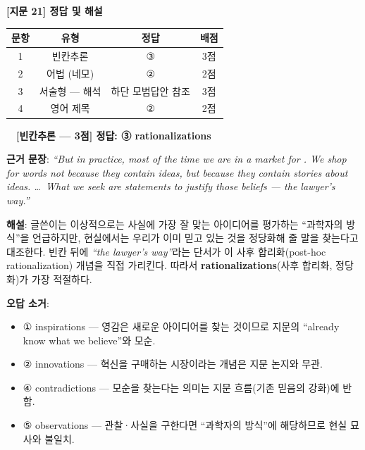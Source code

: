 \documentclass[11pt,a4paper]{article}
\newcommand{\qno}[1]{\par\vspace{10pt}\noindent{\sffamily\bfseries #1.}\ }
\begin{document}
\begin{center}
{\fontsize{15}{17}\selectfont\sffamily\bfseries [지문 21] 정답 및 해설}
\end{center}
\vspace{6pt}

\begin{center}
\begin{tabular}{cccc}
\toprule
\textbf{문항} & \textbf{유형} & \textbf{정답} & \textbf{배점} \\
\midrule
1 & 빈칸추론 & ③ & 3점 \\
2 & 어법 (네모) & ② & 2점 \\
3 & 서술형 --- 해석 & 하단 모범답안 참조 & 3점 \\
4 & 영어 제목 & ② & 2점 \\
\bottomrule
\end{tabular}
\end{center}

\bigskip

\qno{1}\ \textbf{[빈칸추론 --- 3점] 정답: ③ rationalizations}

\vspace{4pt}
\noindent\textbf{근거 문장}: \textit{``But in practice, most of the time we are in a market for \underline{\hspace{3.5cm}}. We shop for words not because they contain ideas, but because they contain stories about ideas. \ldots\ What we seek are statements to justify those beliefs --- the lawyer's way.''}

\vspace{4pt}
\noindent\textbf{해설}: 글쓴이는 이상적으로는 사실에 가장 잘 맞는 아이디어를 평가하는 ``과학자의 방식''을 언급하지만, 현실에서는 우리가 이미 믿고 있는 것을 정당화해 줄 말을 찾는다고 대조한다. 빈칸 뒤에 \textit{``the lawyer's way''}라는 단서가 이 사후 합리화(post-hoc rationalization) 개념을 직접 가리킨다. 따라서 \textbf{rationalizations}(사후 합리화, 정당화)가 가장 적절하다.

\vspace{6pt}
\noindent\textbf{오답 소거}:
\begin{itemize}[leftmargin=2em,itemsep=1pt,topsep=2pt]
  \item ① inspirations --- 영감은 새로운 아이디어를 찾는 것이므로 지문의 ``already know what we believe''와 모순.
  \item ② innovations --- 혁신을 구매하는 시장이라는 개념은 지문 논지와 무관.
  \item ④ contradictions --- 모순을 찾는다는 의미는 지문 흐름(기존 믿음의 강화)에 반함.
  \item ⑤ observations --- 관찰·사실을 구한다면 ``과학자의 방식''에 해당하므로 현실 묘사와 불일치.
\end{itemize}
\end{document}
